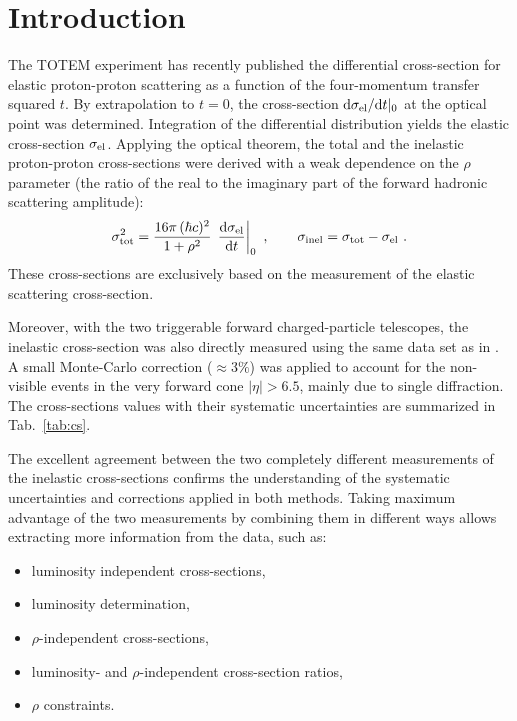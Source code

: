 \documentclass[doublecol]{epl/epl2}
\def\d{{\rm d}}
\begin{document}
\section{Introduction}

The TOTEM experiment has recently published \cite{epl96,P1} the differential cross-section for elastic proton-proton scattering as a function of the four-momentum transfer squared $t$. By extrapolation to $t=0$, the cross-section $\d\sigma_{\rm el}/\d t|_{0}$ at the optical point was determined. Integration of the differential distribution yields the elastic cross-section $\sigma_{\rm el}$. Applying the optical theorem, the total and the inelastic proton-proton cross-sections were derived with a weak dependence on the $\rho$ parameter (the ratio of the real to the imaginary part of the forward hadronic scattering amplitude):
\begin{equation}
\label{eq:m el}
	\sigma_{\rm tot}^2 = {16\pi\, (\hbar c)^2\over 1 + \rho^2}\, \left. \d\sigma_{\rm el}\over\d t\right|_0\ ,\qquad
	\sigma_{\rm inel} = \sigma_{\rm tot} - \sigma_{\rm el}\ .
\end{equation}
These cross-sections are exclusively based on the measurement of the elastic scattering cross-section.

Moreover, with the two triggerable forward charged-particle telescopes, the inelastic cross-section was also directly measured \cite{P2} using the same data set as in \cite{P1}. A small Monte-Carlo correction ($\approx 3\%$) was applied to account for the non-visible events in the very forward cone $|\eta| > 6.5$, mainly due to single diffraction. The cross-sections values with their systematic uncertainties are summarized in Tab.~\ref{tab:cs}.

The excellent agreement between the two completely different measurements of the inelastic cross-sections confirms the understanding of the systematic uncertainties and corrections applied in both methods. Taking maximum advantage of the two measurements by combining them in different ways allows extracting more information from the data, such as:
\begin{itemize}
\setlength{\topskip}{0pt}%
\setlength{\itemsep}{0pt}%
\item luminosity independent cross-sections,
\item luminosity determination,
\item $\rho$-independent cross-sections,
\item luminosity- and $\rho$-independent cross-section ratios,
\item $\rho$ constraints.
\end{itemize}
\end{document}
